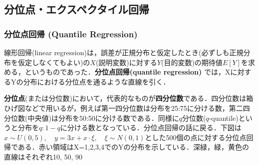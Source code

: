 \subsection{分位点・エクスペクタイル回帰}
\subsubsection{分位点回帰 (Quantile Regression)}
線形回帰(linear regression)は，誤差が正規分布と仮定したとき(必ずしも正規分布を仮定しなくてもよい)の$X$(説明変数)に対する$Y$(目的変数)の期待値$E[Y]$を求める，というものであった．\textbf{分位点回帰(quantile regression)} では，Xに対するYの分布における分位点を通るような直線を引く．

\textbf{分位点}(または分位数)において，代表的なものが\textbf{四分位数}である．四分位数は箱ひげ図などで用いるが，例えば第一四分位数は分布を25:75に分ける数，第二四分位数(中央値)は分布を50:50に分ける数である．同様に$q$分位数($q$-quantile)というと分布を$q:1-q$に分ける数となっている．分位点回帰の話に戻る．下図は$x\sim U(0, 5),\quad y=3x+x\cdot \xi,\quad \xi\sim N(0,1)$とした500個の点に対する分位点回帰である．赤い領域はX=1,2,3,4でのYの分布を示している．深緑，緑，黄色の直線はそれぞれ10, 50, 90%
